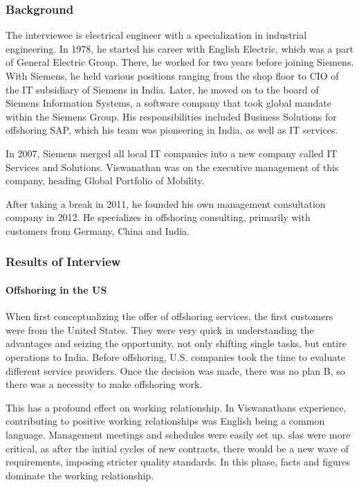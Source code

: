 \subsubsection{Background}
The interviewee is electrical engineer with a specialization in industrial engineering. In 1978, he started his career with English Electric, which was a part of General Electric Group. There, he worked for two years before joining Siemens. With Siemens, he held various positions ranging from the shop floor to CIO of the IT subsidiary of Siemens in India. Later, he moved on to the board of Siemens Information Systems, a software company that took global mandate within the Siemens Group. His responsibilities included Business Solutions for offshoring SAP, which his team was pioneering in India, as well as IT services.

In 2007, Siemens merged all local IT companies into a new company called IT Services and Solutions. Viswanathan was on the executive management of this company, heading Global Portfolio of Mobility.

After taking a break in 2011, he founded his own management consultation company in 2012. He specializes in offshoring consulting, primarily with customers from Germany, China and India.

\subsubsection{Results of Interview}
\paragraph{Offshoring in the US}When first conceptualizing the offer of offshoring services, the first customers were from the United States. They were very quick in understanding the advantages and seizing the opportunity, not only shifting single tasks, but entire operations to India. Before offshoring, U.S. companies took the time to evaluate different service providers. Once the decision was made, there was no plan B, so there was a necessity to make offshoring work.

This has a profound effect on working relationship. In Viswanathans experience, contributing to positive working relationships was English being a common language. Management meetings and schedules were easily set up. \Glspl{sla} were more critical, as after the initial cycles of new contracts, there would be a new wave of requirements, imposing stricter quality standards. In this phase, facts and figures dominate the working relationship.

